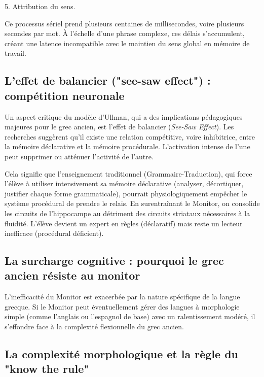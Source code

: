 5. Attribution du sens.

Ce processus sériel prend plusieurs centaines de millisecondes, voire plusieurs secondes par mot. À
l'échelle d'une phrase complexe, ces délais s'accumulent, créant une latence incompatible avec le
maintien du sens global en mémoire de travail.\cite{II-2-3-ref19}



\subsection{L'effet de balancier ("see-saw effect") : compétition neuronale}

Un aspect critique du modèle d'Ullman, qui a des implications pédagogiques majeures pour le grec
ancien, est l'effet de \og balancier\fg{} (\textit{See-Saw Effect}). Les recherches suggèrent qu'il
existe une relation compétitive, voire inhibitrice, entre la mémoire déclarative et la mémoire
procédurale. L'activation intense de l'une peut supprimer ou atténuer l'activité de
l'autre.\cite{II-2-3-ref16}

Cela signifie que l'enseignement traditionnel (Grammaire-Traduction), qui force l'élève à utiliser
intensivement sa mémoire déclarative (analyser, décortiquer, justifier chaque forme grammaticale),
pourrait physiologiquement empêcher le système procédural de prendre le relais. En surentraînant le
Monitor, on consolide les circuits de l'hippocampe au détriment des circuits striataux nécessaires à
la fluidité. L'élève devient un expert en règles (déclaratif) mais reste un lecteur inefficace
(procédural déficient).\cite{II-2-3-ref23}



\subsection{La surcharge cognitive : pourquoi le grec ancien résiste au monitor}

L'inefficacité du Monitor est exacerbée par la nature spécifique de la langue grecque. Si le Monitor
peut éventuellement gérer des langues à morphologie simple (comme l'anglais ou l'espagnol de base)
avec un ralentissement modéré, il s'effondre face à la complexité flexionnelle du grec ancien.



\subsection{La complexité morphologique et la règle du "know the rule"}

